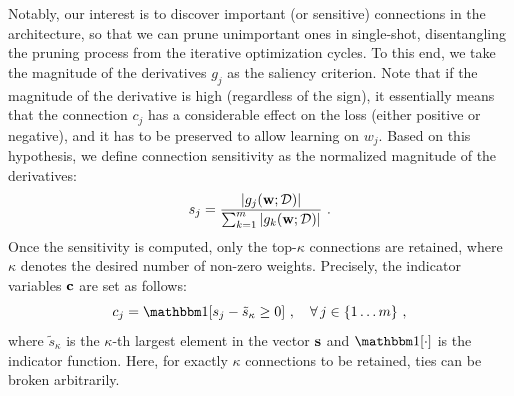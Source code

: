 Notably, our interest is to discover important (or sensitive) connections in the architecture, so that we can prune unimportant ones in single-shot, disentangling the pruning process from the iterative optimization cycles.
To this end, we take the magnitude of the derivatives $g_j$ as the saliency criterion. 
Note that if the magnitude of the derivative is high (regardless of the sign), it essentially means that the connection $c_j$ has a considerable effect on the loss (either positive or negative), and it has to be preserved to allow learning on $w_j$. 
Based on this hypothesis, we define connection sensitivity as the normalized magnitude of the derivatives:
\vspace{-2mm}
\begin{equation}\label{eq:sens}
s_j = \frac{\left|g_j(\rvw;\gD)\right| }{\sum_{k=1}^m
\left|g_k(\rvw;\gD)\right|}\ .%
\end{equation}
Once the sensitivity is computed, only the top-$\kappa$ connections are retained, where $\kappa$ denotes the desired number of non-zero weights.
Precisely, the indicator variables ${\mathbf{c}}$ are set as follows:
\begin{equation}
c_j =\I[s_j - \tilde{s}_{\kappa} \ge 0]\ ,\quad \forall\,j\in \allweights\ ,
\end{equation}
where $\tilde{s}_{\kappa}$ is the $\kappa$-th largest element in the vector ${\mathbf{s}}$ and $\I[\cdot]$ is the indicator function. 
Here, for exactly $\kappa$ connections to be retained, ties can be broken arbitrarily.

